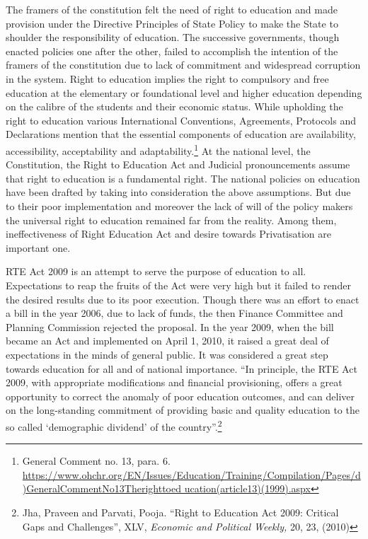 \begin{multicols}{2}
\noi
The framers of the constitution felt the need of right to education and made provision under
the Directive Principles of State Policy to make the State to shoulder the responsibility of
education. The successive governments, though enacted policies one after the other, failed to
accomplish the intention of the framers of the constitution due to lack of commitment and
widespread corruption in the system. Right to education implies the right to compulsory and
free education at the elementary or foundational level and higher education depending on the
calibre of the students and their economic status. While upholding the right to education
various International Conventions, Agreements, Protocols and Declarations mention that the
essential components of education are availability, accessibility, acceptability and
adaptability.\footnote{General Comment no. 13, para. 6. \url{https://www.ohchr.org/EN/Issues/Education/Training/Compilation/Pages/d)GeneralCommentNo13Therighttoed
ucation(article13)(1999).aspx}} At the national level, the Constitution, the Right to Education Act and Judicial
pronouncements assume that right to education is a fundamental right. The national policies on education have been drafted by taking into consideration the above assumptions. But due
to their poor implementation and moreover the lack of will of the policy makers the universal
right to education remained far from the reality. Among them, ineffectiveness of Right
Education Act and desire towards Privatisation are important one.

\vspace{-.1cm}


\vspace{-.1cm}

\noi
RTE Act 2009 is an attempt to serve the purpose of education to all. Expectations to reap the
fruits of the Act were very high but it failed to render the desired results due to its poor
execution. Though there was an effort to enact a bill in the year 2006, due to lack of funds,
the then Finance Committee and Planning Commission rejected the proposal. In the year
2009, when the bill became an Act and implemented on April 1, 2010, it raised a great deal of
expectations in the minds of general public. It was considered a great step towards education
for all and of national importance. “In principle, the RTE Act 2009, with appropriate
modifications and financial provisioning, offers a great opportunity to correct the anomaly of
poor education outcomes, and can deliver on the long-standing commitment of providing
basic and quality education to the so called ‘demographic dividend’ of the country”.\footnote{Jha, Praveen and Parvati, Pooja. “Right to Education Act 2009: Critical Gaps and Challenges”, XLV, \textit{Economic and Political Weekly,} 20, 23, (2010)}


\end{multicols}
